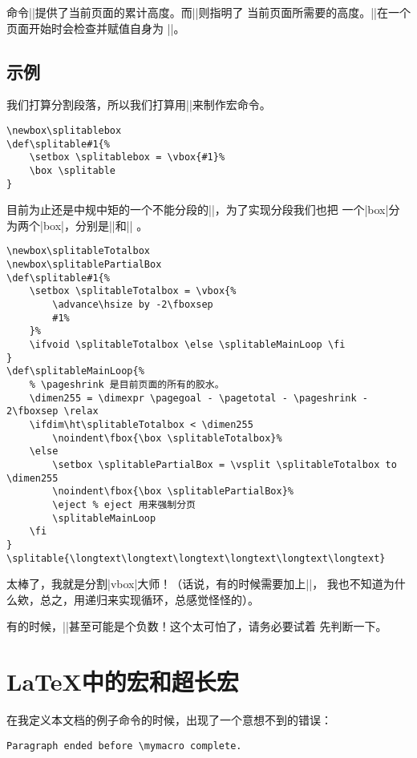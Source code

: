 命令\ttva|\pagetotal|提供了当前页面的累计高度。而\ttva|\pagegoal|则指明了
当前页面所需要的高度。\ttva|\pagegoal|在一个页面开始时会检查并赋值自身为%
\ttva|\vsize|。

\subsection{示例}

我们打算分割段落，所以我们打算用\ttva|\splitable|来制作宏命令。
\begin{lstlisting}
\newbox\splitablebox
\def\splitable#1{%
    \setbox \splitablebox = \vbox{#1}%
    \box \splitable
}
\end{lstlisting}

目前为止还是中规中矩的一个不能分段的\ttva|\vbox|，为了实现分段我们也把
一个\ttva|box|分为两个\ttva|box|，分别是\ttva|\totalbox|和\ttva|\partialbox|%
。
\begin{lstlisting}
\newbox\splitableTotalbox
\newbox\splitablePartialBox
\def\splitable#1{%
    \setbox \splitableTotalbox = \vbox{%
        \advance\hsize by -2\fboxsep
        #1%
    }%
    \ifvoid \splitableTotalbox \else \splitableMainLoop \fi
}
\def\splitableMainLoop{%
    % \pageshrink 是目前页面的所有的胶水。
    \dimen255 = \dimexpr \pagegoal - \pagetotal - \pageshrink - 2\fboxsep \relax
    \ifdim\ht\splitableTotalbox < \dimen255
        \noindent\fbox{\box \splitableTotalbox}%
    \else
        \setbox \splitablePartialBox = \vsplit \splitableTotalbox to \dimen255
        \noindent\fbox{\box \splitablePartialBox}%
        \eject % eject 用来强制分页
        \splitableMainLoop
    \fi
}
\splitable{\longtext\longtext\longtext\longtext\longtext\longtext}
\end{lstlisting}

太棒了，我就是分割\ttva|vbox|大师！（话说，有的时候需要加上\ttva|\null|，
我也不知道为什么欸，总之，用递归来实现循环，总感觉怪怪的）。

有的时候，\ttva||甚至可能是个负数！这个太可怕了，请务必要试着
先判断一下。


\section{\LaTeX{}中的宏和超长宏}

在我定义本文档的例子命令的时候，出现了一个意想不到的错误：
\begin{lstlisting}
Paragraph ended before \mymacro complete.
\end{lstlisting}

